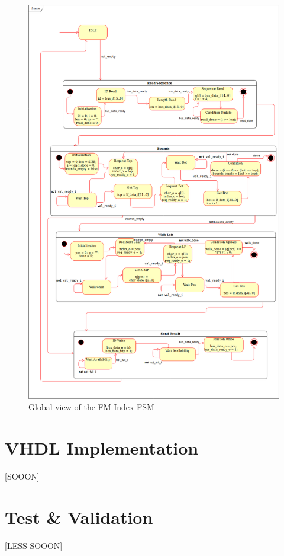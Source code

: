 \begin{figure}[H]
 \includegraphics[scale = 0.36]{Figures/MSS.png}
    \caption{Global view of the FM-Index FSM}
    \label{fig:fsm}
\end{figure}


\section{VHDL Implementation}

[SOOON]

\section{Test \& Validation}

[LESS SOOON]











